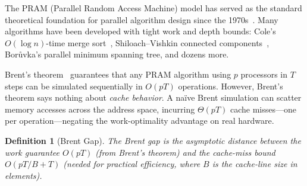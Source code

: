 \documentclass[11pt]{article}
\newtheorem{definition}[theorem]{Definition}
\begin{document}
The PRAM (Parallel Random Access Machine) model has served as the standard
theoretical foundation for parallel algorithm design since the
1970s~\cite{jaja1992introduction}.  Many algorithms have been developed
with tight work and depth bounds: Cole's $O(\log n)$-time merge
sort~\cite{cole1988parallel}, Shiloach--Vishkin connected
components~\cite{shiloach1982logn}, Bor\r{u}vka's parallel minimum spanning
tree, and dozens more.

Brent's theorem~\cite{brent1974parallel} guarantees that any PRAM algorithm
using $p$ processors in $T$ steps can be simulated sequentially in $O(pT)$
operations.  However, Brent's theorem says nothing about \emph{cache behavior}.
A na\"ive Brent simulation can scatter memory accesses across the address space,
incurring $\Theta(pT)$ cache misses---one per operation---negating the
work-optimality advantage on real hardware.

\begin{definition}[Brent Gap]
The \emph{Brent gap} is the asymptotic distance between the work guarantee
$O(pT)$ (from Brent's theorem) and the cache-miss bound $O(pT/B + T)$ (needed
for practical efficiency, where $B$ is the cache-line size in elements).
\end{definition}
\end{document}
